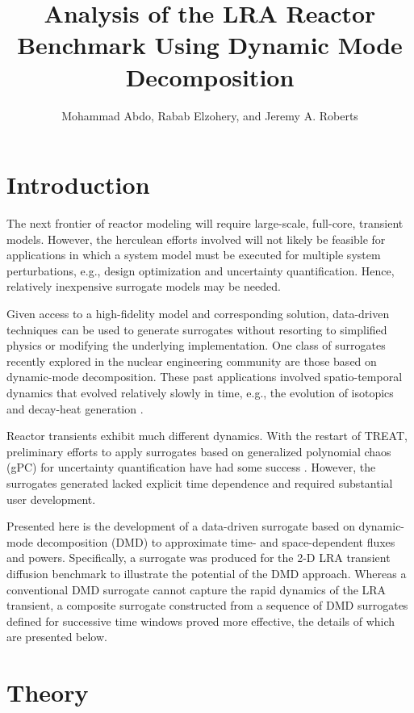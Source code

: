 \documentclass{anstrans}
\title{Analysis of the LRA Reactor Benchmark Using Dynamic Mode Decomposition}
\author{Mohammad Abdo, Rabab Elzohery, and Jeremy A. Roberts}
\institute{
Department of Mechanical \& Nuclear Engineering, Kansas State University, Manhattan, KS 66506
}
\begin{document}
\section{Introduction}

The next frontier of reactor modeling will require large-scale, full-core, transient models.
However, the herculean efforts involved will not likely be feasible for applications in which a system model must be executed for multiple system perturbations, e.g., design optimization and uncertainty quantification.
Hence, relatively  inexpensive surrogate models may be needed.

Given access to a high-fidelity model and corresponding solution, data-driven techniques can be used to generate surrogates without resorting to simplified physics or modifying the underlying implementation.  
One class of surrogates recently explored in the nuclear engineering community are those based on dynamic-mode decomposition.  
These past applications involved spatio-temporal dynamics that evolved relatively slowly in time, e.g., the evolution of isotopics \cite{abdo2018data, elzohery2018cbg} and decay-heat generation \cite{alfonsi2018dhc}.

Reactor transients exhibit much different dynamics.
With the restart of TREAT, preliminary efforts to apply surrogates based on generalized polynomial chaos (gPC) for uncertainty quantification have had some success \cite{wang2017usa}.
However, the surrogates generated lacked explicit time dependence and required substantial user development.

Presented here is the development of a data-driven surrogate based on dynamic-mode decomposition (DMD) to approximate time- and space-dependent fluxes and powers.
Specifically, a surrogate was produced for the 2-D LRA transient diffusion benchmark to illustrate the potential of the DMD approach. 
Whereas a conventional DMD surrogate cannot capture the rapid dynamics of the LRA transient, a composite surrogate constructed from a sequence of DMD surrogates defined for successive time windows proved more effective, the details of which are presented below.


\section{Theory}
\label{sec:backgound}
\end{document}

